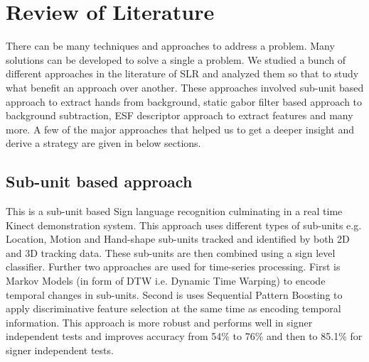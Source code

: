 \chapter{Review of Literature\label{ch:lit-review}}
There can be many techniques and approaches to address a problem. Many solutions can be developed to solve a single a problem. We studied a bunch of different approaches in the literature of SLR and analyzed them so that to study what benefit an approach over another. These approaches involved sub-unit based approach to extract hands from background, static gabor filter based approach to background subtraction, ESF descriptor approach to extract features and many more. A few of the major approaches that helped us to get a deeper insight and derive a strategy are given in below sections.

\section{Sub-unit based approach}
 This is a sub-unit based Sign language recognition culminating in a real time Kinect demonstration system. This approach uses different types of sub-units e.g. Location, Motion and Hand-shape sub-units tracked and identified by both 2D and 3D tracking data. These sub-units are then combined using a sign level classifier. Further two approaches are used for time-series processing. First is Markov Models (in form of DTW i.e. Dynamic Time Warping) to encode temporal changes in sub-units. Second is uses Sequential Pattern Boosting to apply discriminative feature selection at the same time as encoding temporal information. This approach is more robust and performs well in signer independent tests and improves accuracy from 54\% to 76\% and then to 85.1\% for signer independent tests. \cite{no1}


